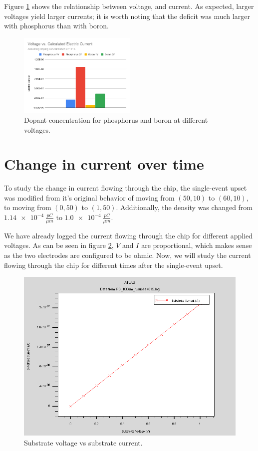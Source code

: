 \documentclass[12pt]{article}
\begin{document}
Figure \ref{fig:voltvcurrent} shows the relationship between voltage, and current. As expected, larger voltages yield larger currents; it is worth noting that the deficit was much larger with phosphorus than with boron.

\begin{figure}[H]
  \centering
  \includegraphics[width=0.5\textwidth]{voltvcurrent}
  \caption{Dopant concentration for phosphorus and boron at different voltages.}
  \label{fig:voltvcurrent}
\end{figure}

\section{Change in current over time}
To study the change in current flowing through the chip, the single-event upset was modified from it's original behavior of moving from $(50, 10)$ to $(60, 10)$, to moving from $(0, 50)$ to $(1, 50)$. Additionally, the density was changed from $\SI{1.14e-4}{\frac{pC}{{\mu}m}}$ to $\SI{1.0e-4}{\frac{pC}{{\mu}m}}$.

We have already logged the current flowing through the chip for different applied voltages. As can be seen in figure \ref{fig:voltvcurrentlog}, $V$ and $I$ are proportional, which makes sense as the two electrodes are configured to be ohmic. Now, we will study the current flowing through the chip for different times after the single-event upset.

\begin{figure}[H]
  \centering
  \includegraphics[width=\textwidth]{voltvcurrentlog}
  \caption{Substrate voltage vs substrate current.}
  \label{fig:voltvcurrentlog}
\end{figure}
\end{document}
